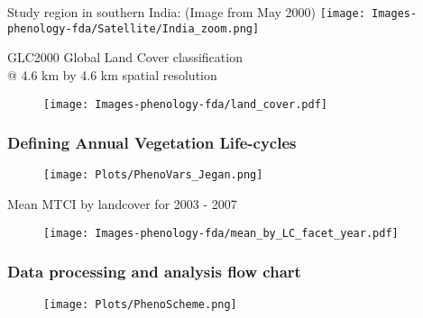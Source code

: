\documentclass{beamer}
\begin{document}
\begin{frame}[t]{Study region in southern India: (Image from May 2000)}
	\texttt{[image: Images-phenology-fda/Satellite/India\_zoom.png]}
\end{frame}

\begin{frame}[t]{GLC2000 Global Land Cover classification \\@ 4.6 km by 4.6 km spatial resolution}
	\begin{figure}
		\texttt{[image: Images-phenology-fda/land\_cover.pdf]}
	\end{figure}
\end{frame}

\frame
{
\frametitle{Defining Annual Vegetation Life-cycles}
\begin{figure}
   \begin{center}
   \texttt{[image: Plots/PhenoVars\_Jegan.png]}
\end{center}
\end{figure}
}

\begin{frame}[t]{Mean MTCI by landcover for 2003 - 2007}
	\begin{figure}
		\texttt{[image: Images-phenology-fda/mean\_by\_LC\_facet\_year.pdf]}
	\end{figure}
\end{frame}

\frame
{
\frametitle{Data processing and analysis flow chart }
\begin{figure} %
   \begin{center}
   \texttt{[image: Plots/PhenoScheme.png]}
   \end{center}
\end{figure}
}
\end{document}
